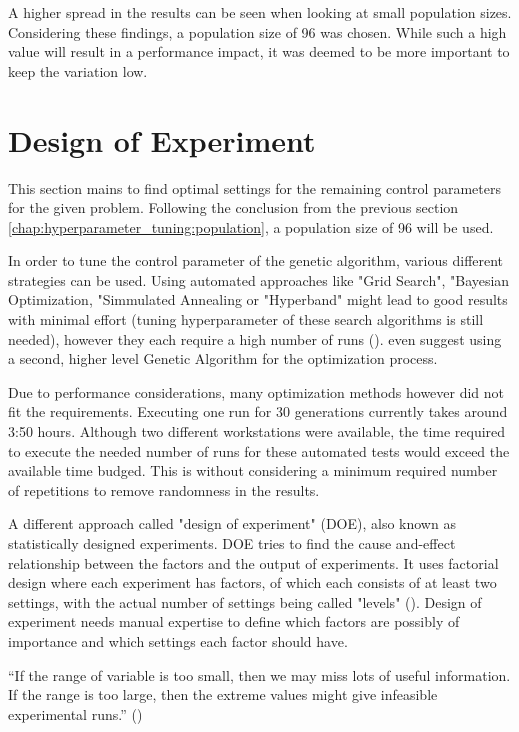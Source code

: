 A higher spread in the results can be seen when looking at small population sizes. Considering these findings, a population size of 96 was chosen. While such a high value will result in a performance impact, it was deemed to be more important to keep the variation low.


\section{Design of Experiment}
\label{chap:hyperparameter_tuning:other_parameter}

This section mains to find optimal settings for the remaining control parameters for the given problem.
Following the conclusion from the previous section \ref{chap:hyperparameter_tuning:population}, a population size of 96 will be used. 

In order to tune the control parameter of the genetic algorithm, various different strategies can be used. Using automated approaches like "Grid Search", "Bayesian Optimization, "Simmulated Annealing or "Hyperband" might lead to good results with minimal effort (tuning hyperparameter of these search algorithms is still needed), however they each require a high number of runs (\cite{kacprzyk_parameter_2007}). \cite{kacprzyk_parameter_2007} even suggest using a second, higher level Genetic Algorithm for the optimization process.

Due to performance considerations, many optimization methods however did not fit the requirements.
Executing one run for 30 generations currently takes around 3:50 hours. Although two different workstations were available, the time required to execute the needed number of runs for these automated tests would exceed the available time budged. This is without considering a minimum required number of repetitions to remove randomness in the results.


A different approach called "design of experiment" (DOE), also known as statistically designed experiments. DOE tries to find the cause and-effect relationship between the factors and the output of experiments.
It uses factorial design where each experiment has factors, of which each consists of at least two settings, with the actual number of settings being called "levels" (\cite{yang_design_2009}). Design of experiment needs manual expertise to define which factors are possibly of importance and which settings each factor should have.

\enquote{If the range of variable is too small, then we may miss lots of useful information. If the range is too large, then the extreme values might give infeasible experimental runs.} (\cite{yang_design_2009})

